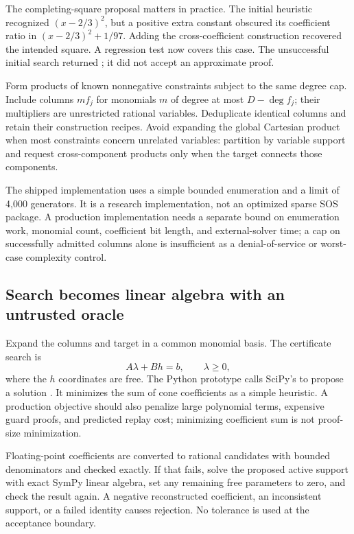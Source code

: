The completing-square proposal matters in practice. The initial heuristic
recognized $(x-2/3)^2$, but a positive extra constant obscured its coefficient
ratio in $(x-2/3)^2+1/97$. Adding the cross-coefficient construction recovered
the intended square. A regression test now covers this case. The unsuccessful
initial search returned ; it did not accept an approximate proof.

Form products of known nonnegative constraints subject to the same degree cap.
Include columns $m f_j$ for monomials $m$ of degree at most $D-\deg f_j$; their
multipliers are unrestricted rational variables. Deduplicate identical columns
and retain their construction recipes. Avoid expanding the global Cartesian
product when most constraints concern unrelated variables: partition by
variable support and request cross-component products only when the target
connects those components.

The shipped implementation uses a simple bounded enumeration and a limit of
4,000 generators. It is a research implementation, not an optimized sparse
SOS package. A production implementation needs a separate bound on enumeration
work, monomial count, coefficient bit length, and external-solver time; a cap
on successfully admitted columns alone is insufficient as a denial-of-service
or worst-case complexity control.

\subsection{Search becomes linear algebra with an untrusted oracle}

Expand the columns and target in a common monomial basis. The certificate
search is
\begin{equation}\label{eq:lp}
 A\lambda+Bh=b,\qquad \lambda\geq0,
\end{equation}
where the $h$ coordinates are free. The Python prototype calls SciPy's
 to propose a solution \cite{scipy-lp}.
It minimizes the sum of cone coefficients as a simple heuristic. A production
objective should also penalize large polynomial terms, expensive guard proofs,
and predicted replay cost; minimizing coefficient sum is not proof-size
minimization.

Floating-point coefficients are converted to rational candidates with bounded
denominators and checked exactly. If that fails, solve the proposed active
support with exact SymPy linear algebra, set any remaining free parameters to
zero, and check the result again. A negative reconstructed coefficient, an
inconsistent support, or a failed identity causes rejection. No tolerance is
used at the acceptance boundary.

